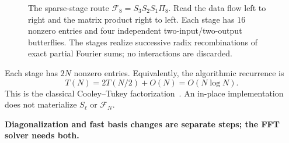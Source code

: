\documentclass[11pt,a4paper]{article}
\newcommand{\takeaway}[1]{\begin{center}\colorbox{light}{\parbox{0.95\linewidth}{\vspace{5pt}\centering\textbf{#1}\vspace{5pt}}}\end{center}}
\begin{document}
\begin{figure}[htbp]
\centering
{}
\caption{The sparse-stage route $\mathcal F_8=S_3S_2S_1\Pi_8$. Read the data flow left to right and the matrix product right to left. Each stage has $16$ nonzero entries and four independent two-input/two-output butterflies. The stages realize successive radix recombinations of exact partial Fourier sums; no interactions are discarded.}
\label{fig:fft-stages-n8}
\end{figure}

Each stage has $2N$ nonzero entries. Equivalently, the algorithmic recurrence is
\[
 T(N)=2T(N/2)+O(N)=O(N\log N).
\]
This is the classical Cooley--Tukey factorization~\cite{cooley1965fft}. An in-place implementation does not materialize $S_\ell$ or $\mathcal F_N$.
\takeaway{Diagonalization and fast basis changes are separate steps; the FFT solver needs both.}
\end{document}
